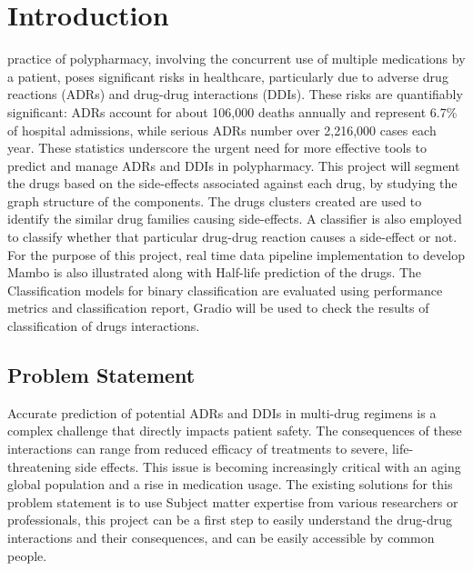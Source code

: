 \documentclass[journal,transmag]{J-NaNA}
\begin{document}
\maketitle


\NaNAdisplaynontitleabstractindextext

\NaNApeerreviewmaketitle



\section{Introduction}

 practice of polypharmacy, involving the concurrent use of multiple medications by a patient, poses significant risks in healthcare, particularly due to adverse drug reactions (ADRs) and drug-drug interactions (DDIs). These risks are quantifiably significant: ADRs account for about 106,000 deaths annually and represent 6.7\% of hospital admissions, while serious ADRs number over 2,216,000 cases each year. These statistics underscore the urgent need for more effective tools to predict and manage ADRs and DDIs in polypharmacy. This project will segment the drugs based on the side-effects associated against each drug, by studying the graph structure of the components. The drugs clusters created are used to identify the similar drug families causing side-effects. A classifier is also employed to classify whether that particular drug-drug reaction causes a side-effect or not. For the purpose of this project, real time data pipeline implementation to develop Mambo is also illustrated along with Half-life prediction of the drugs. The Classification models for binary classification are evaluated using performance metrics and classification report, Gradio will be used to check the results of classification of drugs interactions.
\subsection{Problem Statement}
Accurate prediction of potential ADRs and DDIs in multi-drug regimens is a complex challenge that directly impacts patient safety. The consequences of these interactions can range from reduced efficacy of treatments to severe, life-threatening side effects. This issue is becoming increasingly critical with an aging global population and a rise in medication usage. The existing solutions for this problem statement is to use Subject matter expertise from various researchers or professionals, this project can be a first step to easily understand the drug-drug interactions and their consequences, and can be easily accessible by common people. 
\end{document}
